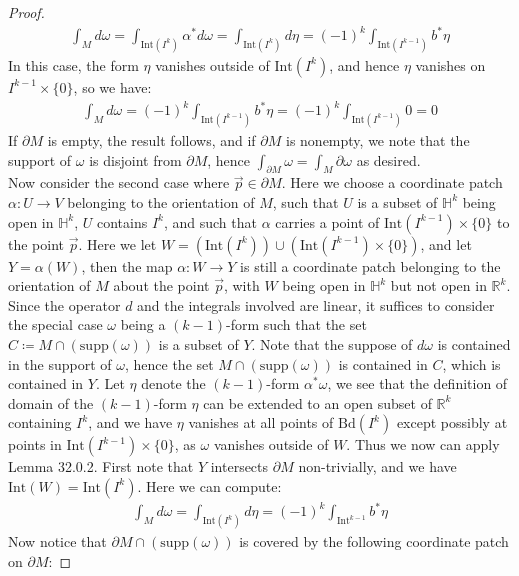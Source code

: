 \documentclass[15pt]{book}
\theoremstyle{break}
\theoremstyle{break}
\newcommand{\R}{\mathbb{R}}
\newcommand{\Int}{\text{Int}}
\newcommand{\Bd}{\text{Bd}}
\newcommand{\supp}{\text{supp}}
\begin{document}
\begin{proof}
\begin{align*}
\int_M d\omega = \int_{\Int(I^k)}\alpha^*d\omega = \int_{\Int(I^k)} d\eta = (-1)^k \int_{\Int(I^{k-1})} b^* \eta
\end{align*}
In this case, the form $\eta$ vanishes outside of $\Int(I^k)$, and hence $\eta$ vanishes on $I^{k-1}\times \{0\}$, so we have:
\begin{align*}
\int_M d\omega = (-1)^k \int_{\Int(I^{k-1})} b^* \eta  = (-1)^k \int_{\Int(I^{k-1})}0 = 0
\end{align*}
If $\partial M$ is empty, the result follows, and if $\partial M$ is nonempty, we note that the support of $\omega$ is disjoint from $\partial M$, hence $\int_{\partial M}\omega = \int_M \partial \omega$ as desired.\\

Now consider the second case where $\vec{p}\in \partial M$. Here we choose a coordinate patch $\alpha:U \to V$ belonging to the orientation of $M$, such that $U$ is a subset of $\mathbb{H}^k$ being open in $\mathbb{H}^k$, $U$ contains $I^k$, and such that $\alpha$ carries a point of $\Int(I^{k-1}) \times \{0\}$ to the point $\vec{p}$. Here we let $W = (\Int(I^k))\cup (\Int(I^{k-1}) \times \{0\})$, and let $Y = \alpha(W)$, then the map $\alpha:W \to Y$ is still a coordinate patch belonging to the orientation of $M$ about the point $\vec{p}$, with $W$ being open in $\mathbb{H}^k$ but not open in $\R^k$. Since the operator $d$ and the integrals involved are linear, it suffices to consider the special case $\omega$ being a $(k-1)$-form such that the set $C\coloneqq M\cap (\supp(\omega))$ is a subset of $Y$. Note that the suppose of $d\omega$ is contained in the support of $\omega$, hence the set $M\cap (\supp(\omega))$ is contained in $C$, which is contained in $Y$. Let $\eta$ denote the $(k-1)$-form $\alpha^*\omega$, we see that the definition of domain of the $(k-1)$-form $\eta$ can be extended to an open subset of $\R^k$ containing $I^k$, and we have $\eta$ vanishes at all points of $\Bd(I^k)$ except possibly at points in $\Int(I^{k-1})\times \{0\}$, as $\omega$ vanishes outside of $W$. Thus we now can apply Lemma 32.0.2. First note that $Y$ intersects $\partial M$ non-trivially, and we have $\Int(W) = \Int(I^k)$. Here we can compute:
\begin{align*}
\int_M d \omega = \int_{\Int(I^k)} d\eta = (-1)^k \int_{\Int^{k-1}} b^*\eta \tag{**}
\end{align*}
Now notice that $\partial M \cap (\supp(\omega))$ is covered by the following coordinate patch on $\partial M$:

\end{proof}
\end{document}
